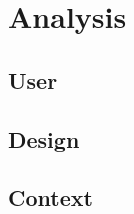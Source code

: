 \section{Analysis}\label{sec:analysis}

\subsection{User}
\subsection{Design}
\subsection{Context}











